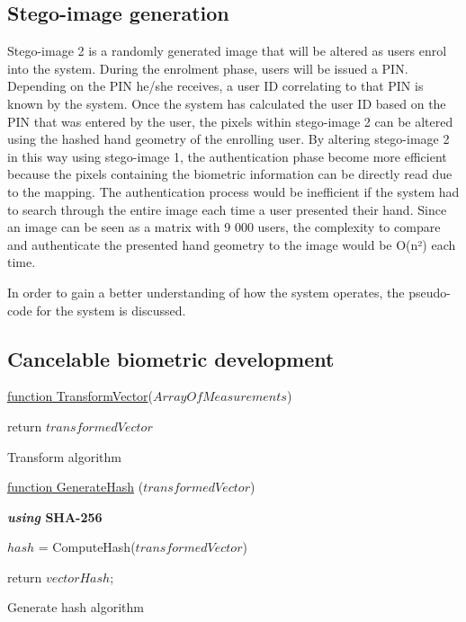 \subsection{Stego-image generation}

Stego-image 2 is a randomly generated image that will be altered as users enrol into the system. During the enrolment phase, users will be issued a PIN. Depending on the PIN he/she receives, a user ID correlating to that PIN is known by the system. Once the system has calculated the user ID based on the PIN that was entered by the user, the pixels within stego-image 2 can be altered using the hashed hand geometry of the enrolling user. By altering stego-image 2 in this way using stego-image 1, the authentication phase become more efficient because the pixels containing the biometric information can be directly read due to the mapping. The authentication process would be inefficient if the system had to search through the entire image each time a user presented their hand. Since an image can be seen as a matrix with 9 000 users, the complexity to compare and authenticate the presented hand geometry to the image would be O(n²) each time. 

In order to gain a better understanding of how the system operates, the pseudo-code for the system is discussed.

\subsection{Cancelable biometric development}


\begin{algorithm}
     
     \underline{function TransformVector}($ArrayOfMeasurements$)\;
     
     
     return $transformedVector$\;
     \label{algorithm: Transform algorithm}
     \caption{Transform algorithm}
\end{algorithm}


\begin{algorithm}
     
     \underline{function GenerateHash} ($transformedVector$)\;
     
     \textbf{\textit{using} SHA-256}{
        $hash$ = ComputeHash($transformedVector$)\;
        
    
     }
     return $vectorHash$;
     \label{algorithm: Generate hash algorithm}
     \caption{Generate hash algorithm}
\end{algorithm}

